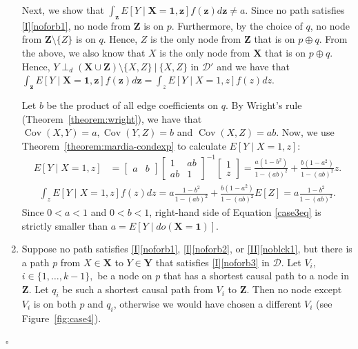 \documentclass[11pt,a4paper]{article}
\newcommand\given[1][]{\:#1\vert\:}
\newcommand{\dsepp}{\perp_{d}}
\newenvironment{proofof}[1][]{\begin{trivlist}
   \item[\hskip \labelsep {\bfseries Proof of #1.}]}{\hfill{}$\square$\end{trivlist}}
\DeclareMathOperator{\Cov}{Cov}
\newcommand{\g}[1][G]{\mathcal{#1}}
\begin{document}
\begin{proofof}[Theorem~\ref{theorem:completeness ac}]
\begin{enumerate}[label=(\roman*)]
Next, we show that $\int_\mathbf{z}E[Y \mid \mathbf{X=1},\mathbf{z}]f(\mathbf{z})d\mathbf{z} \neq a$. Since no path  satisfies \ref{I}\ref{noforb1}, no node from $\mathbf{Z}$ is on $p$. Furthermore, by the choice of $q$, no node from $\mathbf{Z} \setminus \{Z\}$ is on $q$. Hence, $Z$ is the only node from $\mathbf{Z}$ that is on $p \oplus q$. From the above, we also know that $X$ is the only node from $\mathbf{X}$ that is on $p \oplus q$. Hence, $Y \dsepp (\mathbf{X} \cup \mathbf{Z}) \setminus \{X,Z\} \given \{X,Z\}$ in $\g[D']$ and we have that $\int_\mathbf{z}E[Y \mid \mathbf{X=1},\mathbf{z}]f(\mathbf{z})d\mathbf{z} =\int_z E[Y \mid X=1,z]f(z)dz$.

Let $b$ be the product of all edge coefficients on $q$. By Wright's rule (Theorem~\ref{theorem:wright}), we have that $\Cov(X,Y) = a, \Cov(Y,Z) =b$ and $\Cov(X,Z) =ab$. Now, we use Theorem~\ref{theorem:mardia-condexp} to calculate $E[Y \mid X=1,z]$:
\begin{align*}
 E[ Y \mid X=1,z] &= \begin{bmatrix}
       a & b
     \end{bmatrix}
     \begin{bmatrix}
       1 & ab \\
       ab & 1
     \end{bmatrix}^{-1}
     \begin{bmatrix}
       1  \\
       z
     \end{bmatrix}
=\frac{a(1-b^2)}{1-(ab)^2} + \frac{b(1-a^2)}{1-(ab)^2}z.
\end{align*}
\begin{align}
\int_z E[Y \mid X=1,z]f(z)dz
= a\frac{1-b^2}{1-(ab)^2} +  \frac{b(1-a^2)}{1-(ab)^2} E[Z] =a\frac{1-b^2}{1-(ab)^2}. \label{case3eq}
\end{align}
Since $0<a <1$ and $0< b <1$, right-hand side of Equation \eqref{case3eq} is strictly smaller than $a = E[Y \mid do(\mathbf{X} =\mathbf{1})]$.
\item\label{case4}  Suppose no path satisfies \ref{I}\ref{noforb1},  \ref{I}\ref{noforb2}, or \ref{II}\ref{noblck1}, but there is a path $p$ from $X \in \mathbf{X}$ to $Y \in \mathbf{Y}$ that satisfies \ref{I}\ref{noforb3} in $\g[D]$. Let $V_i$, $i \in \{1,\dots,k-1\},$ be a node on $p$ that has a shortest causal path to a node in $\mathbf{Z}$. Let $q_i$ be such a shortest causal path from $V_i$ to $\mathbf{Z}$. Then no node except $V_i$ is on both $p$ and $q_i$, otherwise we would have chosen a different $V_i$ (see Figure~\ref{fig:case4}).


\end{enumerate}
\end{proofof}
\end{document}
